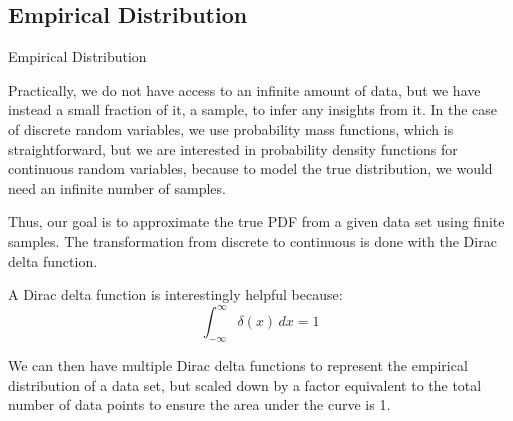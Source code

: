 \subsection{Empirical Distribution}


\begin{intuitbox}{Empirical Distribution}
    

    Practically, we do not have access to an infinite amount of data, but we have instead a small fraction of it, a sample, to infer any insights from it. In the case of discrete random variables, we use probability mass functions, which is straightforward, but we are interested in probability density functions for continuous random variables, because to model the true distribution, we would need an infinite number of samples. \bigskip

    Thus, our goal is to approximate the true PDF from a given data set using finite samples. The transformation from discrete to continuous is done with the Dirac delta function.\\ \bigskip

    A Dirac delta function is interestingly helpful because:
    \[
    \int_{-\infty}^{\infty} \delta(x) \, dx = 1
    \]

    We can then have multiple Dirac delta functions to represent the empirical distribution of a data set, but scaled down by a factor equivalent to the total number of data points to ensure the area under the curve is 1.\\


\end{intuitbox}
